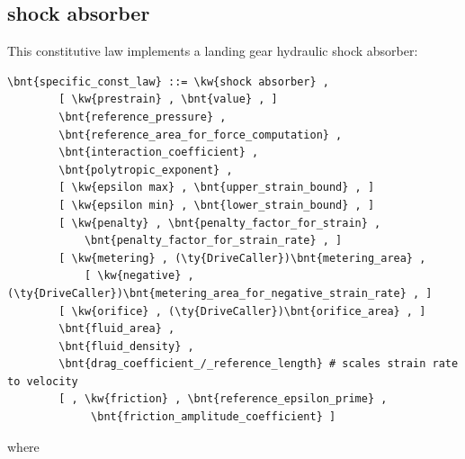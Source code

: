 \subsection{shock absorber}\label{sec:CL:SHOCK-ABSORBER}
This constitutive law implements a landing gear hydraulic shock absorber:
\begin{Verbatim}[commandchars=\\\{\}]
    \bnt{specific_const_law} ::= \kw{shock absorber} ,
        [ \kw{prestrain} , \bnt{value} , ]
        \bnt{reference_pressure} ,
        \bnt{reference_area_for_force_computation} ,
        \bnt{interaction_coefficient} ,
        \bnt{polytropic_exponent} ,
        [ \kw{epsilon max} , \bnt{upper_strain_bound} , ]
        [ \kw{epsilon min} , \bnt{lower_strain_bound} , ]
        [ \kw{penalty} , \bnt{penalty_factor_for_strain} , 
            \bnt{penalty_factor_for_strain_rate} , ]
        [ \kw{metering} , (\ty{DriveCaller})\bnt{metering_area} ,
            [ \kw{negative} , (\ty{DriveCaller})\bnt{metering_area_for_negative_strain_rate} , ]
        [ \kw{orifice} , (\ty{DriveCaller})\bnt{orifice_area} , ]
        \bnt{fluid_area} ,
        \bnt{fluid_density} ,
        \bnt{drag_coefficient_/_reference_length} # scales strain rate to velocity
        [ , \kw{friction} , \bnt{reference_epsilon_prime} ,
             \bnt{friction_amplitude_coefficient} ]
\end{Verbatim}
where
